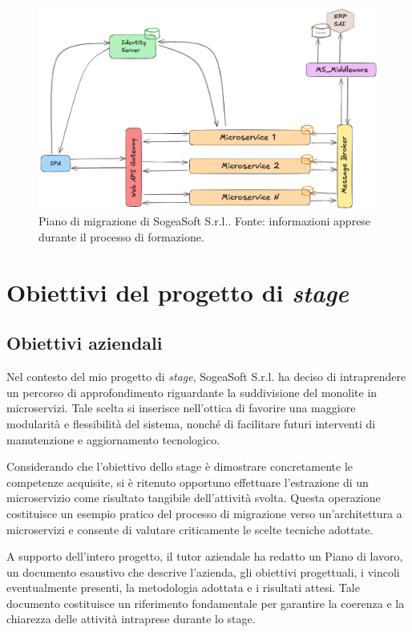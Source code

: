         \begin{figure}[H]
            \centering
            \includegraphics[width=0.6\linewidth]{BCS-Tessi/images/migrazione.png}
            \caption[Piano di migrazione di SogeaSoft S.r.l.]{Piano di migrazione di SogeaSoft S.r.l.. Fonte: informazioni apprese durante il processo di formazione. }
            \label{fig:enter-label}
        \end{figure}
        
    \section{Obiettivi del progetto di \textit{stage}}
        \subsection{Obiettivi aziendali}
        Nel contesto del mio progetto di \textit{stage}, SogeaSoft S.r.l. ha deciso di intraprendere un percorso di approfondimento riguardante la suddivisione del monolite in microservizi. Tale scelta si inserisce nell'ottica di favorire una maggiore modularità e flessibilità del sistema, nonché di facilitare futuri interventi di manutenzione e aggiornamento tecnologico.  

        Considerando che l’obiettivo dello stage è dimostrare concretamente le competenze acquisite, si è ritenuto opportuno effettuare l’estrazione di un microservizio come risultato tangibile dell’attività svolta. Questa operazione costituisce un esempio pratico del processo di migrazione verso un'architettura a microservizi e consente di valutare criticamente le scelte tecniche adottate.  

        A supporto dell’intero progetto, il tutor aziendale ha redatto un Piano di lavoro, un documento esaustivo che descrive l’azienda, gli obiettivi progettuali, i vincoli eventualmente presenti, la metodologia adottata e i risultati attesi. Tale documento costituisce un riferimento fondamentale per garantire la coerenza e la chiarezza delle attività intraprese durante lo stage. 

